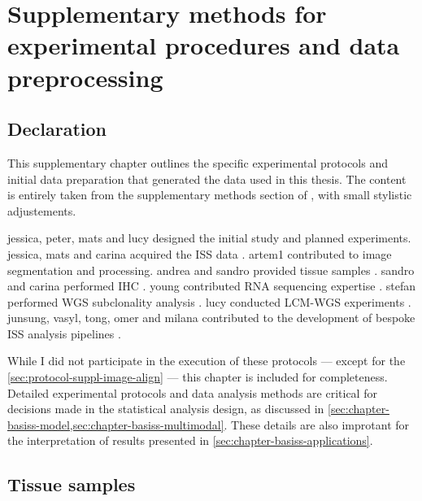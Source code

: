 \chapter{Supplementary methods for experimental procedures and data preprocessing}

\section*{Declaration}

This supplementary chapter outlines the specific experimental protocols and initial data preparation that generated the data used in this thesis. The content is entirely taken from the supplementary methods section of \textcite{Lomakin2022-ks}, with small stylistic adjustements.

\ac{jessica}, \ac{peter}, \ac{mats} and \ac{lucy} designed the initial study and planned experiments. \ac{jessica}, \ac{mats} and \ac{carina} acquired the \ac{ISS} data . \ac{artem1} contributed to image segmentation and processing. \ac{andrea} and \ac{sandro} provided tissue samples . \ac{sandro} and \ac{carina} performed \ac{IHC} . \ac{young} contributed RNA sequencing expertise . \ac{stefan} performed \ac{WGS} subclonality analysis . \ac{lucy} conducted \ac{LCM}-\ac{WGS} experiments . \ac{junsung}, \ac{vasyl}, \ac{tong}, \ac{omer} and \ac{milana} contributed to the development of bespoke \ac{ISS} analysis pipelines .

While I did not participate in the execution of these protocols — except for the \cref{sec:protocol-suppl-image-align} — this chapter is included for completeness. Detailed experimental protocols and data analysis methods are critical for decisions made in the statistical analysis design, as discussed in \cref{sec:chapter-basiss-model,sec:chapter-basiss-multimodal}. These details are also improtant for the interpretation of results presented in \cref{sec:chapter-basiss-applications}.

\section{Tissue samples}
\label{sec:protocol-suppl-tissues}

